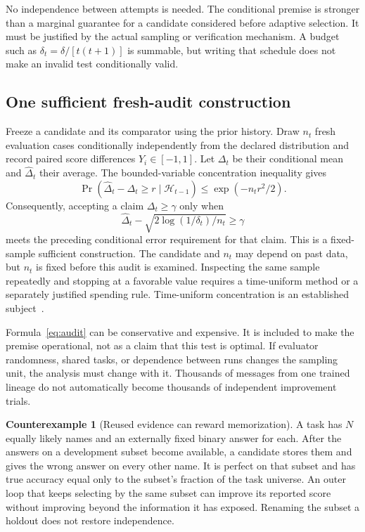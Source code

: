 \documentclass[11pt,letterpaper]{article}
\theoremstyle{plain}
\theoremstyle{definition}
\newtheorem{counterexample}[theorem]{Counterexample}
\begin{document}
No independence between attempts is needed. The conditional premise is stronger than a marginal guarantee for a candidate considered before adaptive selection. It must be justified by the actual sampling or verification mechanism. A budget such as $\delta_t=\delta/[t(t+1)]$ is summable, but writing that schedule does not make an invalid test conditionally valid.

\subsection{One sufficient fresh-audit construction}
Freeze a candidate and its comparator using the prior history. Draw $n_t$ fresh evaluation cases conditionally independently from the declared distribution and record paired score differences $Y_i\in[-1,1]$. Let $\Delta_t$ be their conditional mean and $\widehat\Delta_t$ their average. The bounded-variable concentration inequality gives
\[
\Pr\left(\widehat\Delta_t-\Delta_t\geq r\mid\mathcal H_{t-1}\right)
\leq \exp(-n_tr^2/2).
\]
Consequently, accepting a claim $\Delta_t\geq\gamma$ only when
\begin{equation}\label{eq:audit}
\widehat\Delta_t-\sqrt{2\log(1/\delta_t)/n_t}\geq\gamma
\end{equation}
meets the preceding conditional error requirement for that claim. This is a fixed-sample sufficient construction. The candidate and $n_t$ may depend on past data, but $n_t$ is fixed before this audit is examined. Inspecting the same sample repeatedly and stopping at a favorable value requires a time-uniform method or a separately justified spending rule. Time-uniform concentration is an established subject~\cite{howard}.

Formula~\eqref{eq:audit} can be conservative and expensive. It is included to make the premise operational, not as a claim that this test is optimal. If evaluator randomness, shared tasks, or dependence between runs changes the sampling unit, the analysis must change with it. Thousands of messages from one trained lineage do not automatically become thousands of independent improvement trials.

\begin{counterexample}[Reused evidence can reward memorization]\label{ex:reuse}
A task has $N$ equally likely names and an externally fixed binary answer for each. After the answers on a development subset become available, a candidate stores them and gives the wrong answer on every other name. It is perfect on that subset and has true accuracy equal only to the subset's fraction of the task universe. An outer loop that keeps selecting by the same subset can improve its reported score without improving beyond the information it has exposed. Renaming the subset a holdout does not restore independence.
\end{counterexample}
\end{document}
